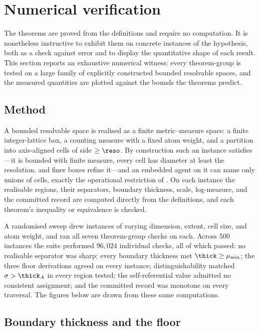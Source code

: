 
\section{Numerical verification}
\label{sec:numerical}

The theorems are proved from the definitions and require no computation. It is
nonetheless instructive to exhibit them on concrete instances of the hypothesis,
both as a check against error and to display the quantitative shape of each
result. This section reports an exhaustive numerical witness: every theorem-group
is tested on a large family of explicitly constructed bounded resolvable spaces,
and the measured quantities are plotted against the bounds the theorems predict.

\subsection{Method}

A bounded resolvable space is realised as a finite metric--measure space: a finite
integer-lattice box, a counting measure with a fixed atom weight, and a partition
into axis-aligned cells of side $\ge\reso$. By construction such an instance
satisfies ---it is bounded with finite measure, every cell has
diameter at least the resolution, and finer boxes refine it---and an embedded
agent on it can name only unions of cells, exactly the operational restriction of
. On each instance the realisable regions, their separators,
boundary thickness, scale, log-measure, and the committed record are computed
directly from the definitions, and each theorem's inequality or equivalence is
checked.

A randomised sweep drew instances of varying dimension, extent, cell size, and
atom weight, and ran all seven theorem-group checks on each. Across
$500$ instances the suite performed $96{,}024$ individual checks, all of which
passed: no realisable separator was sharp; every boundary thickness met
$\thick\ge\mu_{\min}$; the three floor derivations agreed on every instance;
distinguishability matched $\sigma>\thick_A$ in every region tested; the
self-referential value admitted no consistent assignment; and the committed
record was monotone on every traversal. The figures below are drawn from these
same computations.

\subsection{Boundary thickness and the floor}

